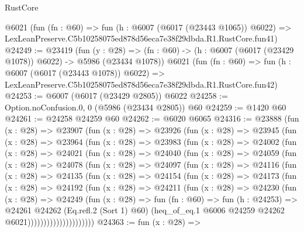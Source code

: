 \begin{lexlean}{RustCore}
\begin{coremodule}
    @6021
    (fun (fn : @60) =>
    fun (h : @6007 (@6017 (@23443 @1065)) @6022) =>
    LexLeanPreserve.C5b10258075ed878d56eca7e38f29dbda.R1.RustCore.fun41)
@24249 := @23419
    (fun (y : @28) =>
    (fn : @60) -> (h : @6007 (@6017 (@23429 @1078)) @6022) -> @5986 (@23434 @1078))
    @6021
    (fun (fn : @60) =>
    fun (h : @6007 (@6017 (@23443 @1078)) @6022) =>
    LexLeanPreserve.C5b10258075ed878d56eca7e38f29dbda.R1.RustCore.fun42)
@24253 := @6007 (@6017 (@23429 @2805)) @6022
@24258 := Option.noConfusion.{0, 0} (@5986 (@23434 @2805)) @60
@24259 := @1420 @60
@24261 := @24258 @24259 @60
@24262 := @6020 @6065
@24316 := @23888
    (fun (x : @28) =>
    @23907
      (fun (x : @28) =>
      @23926
        (fun (x : @28) =>
        @23945
          (fun (x : @28) =>
          @23964
            (fun (x : @28) =>
            @23983
              (fun (x : @28) =>
              @24002
                (fun (x : @28) =>
                @24021
                  (fun (x : @28) =>
                  @24040
                    (fun (x : @28) =>
                    @24059
                      (fun (x : @28) =>
                      @24078
                        (fun (x : @28) =>
                        @24097
                          (fun (x : @28) =>
                          @24116
                            (fun (x : @28) =>
                            @24135
                              (fun (x : @28) =>
                              @24154
                                (fun (x : @28) =>
                                @24173
                                  (fun (x : @28) =>
                                  @24192
                                    (fun (x : @28) =>
                                    @24211
                                      (fun (x : @28) =>
                                      @24230
                                        (fun (x : @28) =>
                                        @24249
                                          (fun (x : @28) =>
                                          fun (fn : @60) =>
                                          fun (h : @24253) =>
                                          @24261
                                            @24262
                                            (Eq.refl.{2} (Sort 1) @60)
                                            (heq_of_eq.{1}
                                              @6006
                                              @24259
                                              @24262
                                              @6021)))))))))))))))))))))
@24363 := fun (x : @28) =>

\end{coremodule}
\end{lexlean}
